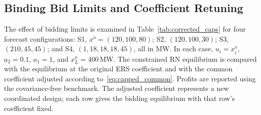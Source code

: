 \documentclass[journal]{IEEEtran}
\begin{document}
\subsection{Binding Bid Limits and Coefficient Retuning}
The effect of bidding limits is examined in Table~\ref{tab:corrected_caps} for four forecast configurations: S1, $x^o=(120,100,80)$; S2, $(120,100,30)$; S3, $(210,45,45)$; and S4, $(1,18,18,18,45)$, all in MW. In each case, $u_i=x_i^o$, $a_2=0.1$, $a_1=1$, and $x_L^o=400$\,MW. The constrained RN equilibrium is compared with the equilibrium at the original ERS coefficient and with the common coefficient adjusted according to~\eqref{eq:capped_common}. Profits are reported using the covariance-free benchmark. The adjusted coefficient represents a new coordinated design; each row gives the bidding equilibrium with that row's coefficient fixed.

\begin{table}[t]
\centering
\caption{Constrained bidding equilibria with fixed and adjusted common coefficients. $\Pi^{(0)}$ excludes covariance contributions, and each retuned row gives the equilibrium at its newly selected common coefficient.}
\label{tab:corrected_caps}
\end{table}
\end{document}
